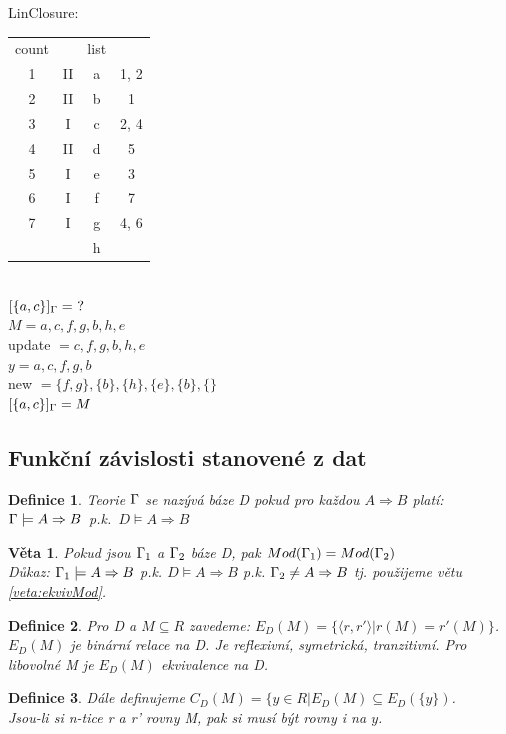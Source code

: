 \documentclass[10pt,a4paper]{article}
\newtheorem{veta}{Věta}
\newtheorem{definition}{Definice}
\begin{document}
LinClosure:\\

\begin{tabular}{cc|cc}
  count && list&  \\
  1 & II & a & 1, 2\\
  2 & II & b & 1\\
  3 & I  & c & 2, 4\\
  4 & II & d & 5\\
  5 & I  & e & 3\\
  6 & I  & f & 7\\
  7 & I  & g & 4, 6\\
  &&h&
\end{tabular}\\
$[\{a,c\}]_\Gamma =~?$\\
$M = a, c, f, g, b, h, e$\\
update $ = c, f, g, b, h, e$\\
$y = a, c, f, g, b$\\
new $= \{f,g\}, \{b\}, \{h\}, \{e\}, \{b\}, \{\}$\\
$[\{a,c\}]_\Gamma = M$\\

\subsection{Funkční závislosti stanovené z dat}
\begin{definition}
Teorie $\Gamma$ se nazývá báze D pokud pro každou $A \Rightarrow B$ platí:
$ \Gamma \models A \Rightarrow B $~p.k.~$ D \models A \Rightarrow B $
\end{definition}

\begin{veta}
Pokud jsou $\Gamma_1$ a $\Gamma_2$ báze D, pak $Mod(\Gamma_1) = Mod(\Gamma_2)$\\
Důkaz: $\Gamma_1 \models A \Rightarrow B$ p.k. $D \models A \Rightarrow B$ p.k. $\Gamma_2 \neq A \Rightarrow B$ tj. použijeme větu \ref{veta:ekvivMod}.
\end{veta}

\begin{definition}
Pro D a $M \subseteq R$ zavedeme: $E_D(M) = \{\langle r,r'\rangle | r(M) = r'(M)\}$.\\
$E_D(M)$ je binární relace na D. Je reflexivní, symetrická, tranzitivní. Pro libovolné M je $E_D(M)$ ekvivalence na D.
\end{definition}

\begin{definition}
Dále definujeme $C_D(M) = \{y \in R | E_D(M) \subseteq E_D(\{y\})$.\\
Jsou-li si n-tice r a r' rovny M, pak si musí být rovny i na $y$.
\end{definition}
\end{document}

